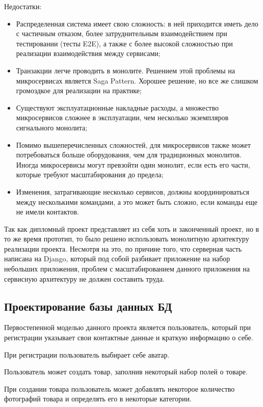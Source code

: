 Недостатки:
\begin{itemize}
    \item Распределенная система имеет свою сложность: в ней приходится иметь дело с частичным отказом, более затруднительным взаимодействием при тестировании (тесты E2E), а также с более высокой сложностью при реализации взаимодействия между сервисами;
    \item Транзакции легче проводить в монолите.
    Решением этой проблемы на микросервисах является Saga Pattern.
    Хорошее решение, но все же слишком громоздкое для реализации на практике;
    \item Существуют эксплуатационные накладные расходы, а множество микросервисов сложнее в эксплуатации, чем несколько экземпляров сигнального монолита;
    \item Помимо вышеперечисленных сложностей, для микросервисов также может потребоваться больше оборудования, чем для традиционных монолитов.
    Иногда микросервисы могут превзойти один монолит, если есть его части, которые требуют масштабирования до предела;
    \item Изменения, затрагивающие несколько сервисов, должны координироваться между несколькими командами, а это может быть сложно, если команды еще не имели контактов.


\end{itemize}
\bigbreak

Так как дипломный проект представляет из себя хоть и законченный проект, но в то же время прототип, то было решено использовать монолитную архитектуру реализации проекта.
Несмотря на это, по причине того, что серверная часть написана на Django, который под собой разбивает приложение на набор небольших приложения, проблем с масштабированием данного приложения на сервисную архитектуру не должен составить труда.


\subsection{Проектирование базы данных БД}

Первостепенной моделью данного проекта является пользователь, который при регистрации указывает свои контактные данные и краткую информацию о себе.

При регистрации пользователь выбирает себе аватар.

Пользователь может создать товар, заполнив некоторый набор полей о товаре.

При создании товара пользователь может добавлять некоторое количество фотографий товара и определять его в некоторые категории.

